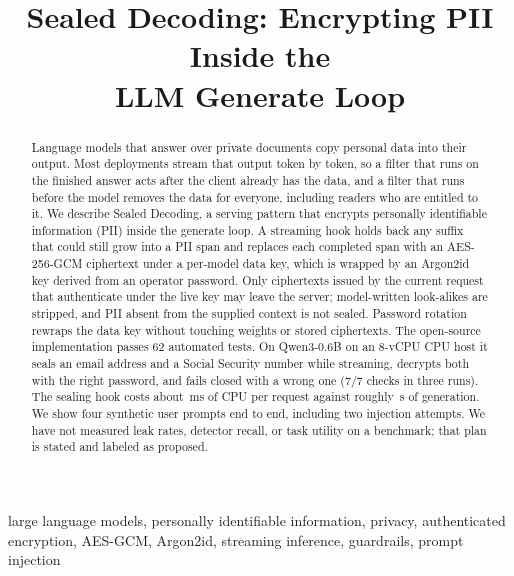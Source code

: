 \documentclass[conference,compsoc]{IEEEtran}
\begin{document}
\title{Sealed Decoding: Encrypting PII Inside the\\LLM Generate Loop}

\author{
}

\maketitle

\begin{abstract}
Language models that answer over private documents copy personal data into their output. Most deployments stream that output token by token, so a filter that runs on the finished answer acts after the client already has the data, and a filter that runs before the model removes the data for everyone, including readers who are entitled to it. We describe Sealed Decoding, a serving pattern that encrypts personally identifiable information (PII) inside the generate loop. A streaming hook holds back any suffix that could still grow into a PII span and replaces each completed span with an AES-256-GCM ciphertext under a per-model data key, which is wrapped by an Argon2id key derived from an operator password. Only ciphertexts issued by the current request that authenticate under the live key may leave the server; model-written look-alikes are stripped, and PII absent from the supplied context is not sealed. Password rotation rewraps the data key without touching weights or stored ciphertexts. The open-source implementation passes 62 automated tests. On Qwen3-0.6B on an 8-vCPU CPU host it seals an email address and a Social Security number while streaming, decrypts both with the right password, and fails closed with a wrong one (7/7 checks in three runs). The sealing hook costs about \mhookMs\,ms of CPU per request against roughly \msealedS\,s of generation. We show four synthetic user prompts end to end, including two injection attempts. We have not measured leak rates, detector recall, or task utility on a benchmark; that plan is stated and labeled as proposed.
\end{abstract}

\begin{IEEEkeywords}
large language models, personally identifiable information, privacy, authenticated encryption, AES-GCM, Argon2id, streaming inference, guardrails, prompt injection
\end{IEEEkeywords}

\end{document}
